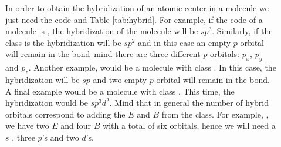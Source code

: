 \documentclass[main.tex]{subfiles}
\begin{document}
\sloppy 
\begin{description}
\item[] In order to obtain the hybridization of an atomic center in a molecule we just need the  code and Table \ref{tab:hybrid}. For example, if the code of a molecule is , the hybridization of the molecule will be $sp^3$. Similarly, if the class is  the hybridization will be $sp^2$ and in this case an empty $p$ orbital will remain in the bond--mind there are three different $p$ orbitals: $p_x$, $p_y$ and $p_z$. Another example, would be a molecule with class . In this case, the hybridization will be $sp$ and two empty $p$ orbital will remain in the bond. A final example would be a molecule with class   . This time, the hybridization would be $sp^3d^2$. Mind that in general the number of hybrid orbitals correspond to adding the $E$ and $B$ from the class. For example,  , we have two $E$ and four $B$ with a total of six orbitals, hence we will need a $s$ , three $p$'s and two $d$'s.














\end{description}
\end{document}
